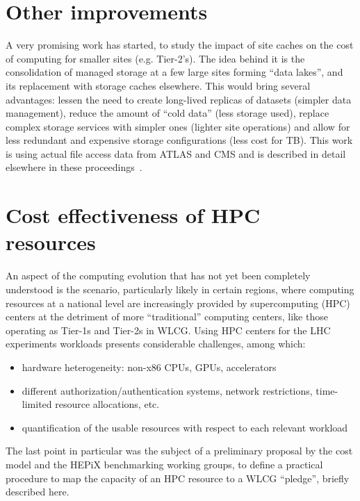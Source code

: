 \section{Other improvements}
A very promising work has started, to study the impact of site caches
on the cost of computing for smaller sites (e.g. Tier-2's). The idea
behind it is the consolidation of managed storage at a few large sites
forming ``data lakes'', and its replacement with storage caches
elsewhere. This would bring several advantages: lessen the need to
create long-lived replicas of datasets (simpler data management),
reduce the amount of ``cold data'' (less storage used), replace
complex storage services with simpler ones (lighter site operations)
and allow for less redundant and expensive storage configurations
(less cost for TB). This work is using actual file access data from
ATLAS and CMS and is described in detail elsewhere in these
proceedings~\cite{cache}.

\section{Cost effectiveness of HPC resources}
An aspect of the computing evolution that has not yet been completely
understood is the scenario, particularly likely in certain regions,
where computing resources at a national level are increasingly
provided by supercomputing (HPC) centers at the detriment of more
``traditional'' computing centers, like those operating as Tier-1s and
Tier-2s in WLCG. Using HPC centers for the LHC experiments workloads
presents considerable challenges, among which:
\begin{itemize}
\item hardware heterogeneity: non-x86 CPUs, GPUs, accelerators
\item different authorization/authentication systems, network
  restrictions, time-limited resource allocations, etc.
\item quantification of the usable resources with respect to each
  relevant workload
\end{itemize}

The last point in particular was the subject of a preliminary proposal
by the cost model and the HEPiX benchmarking working groups, to define
a practical procedure to map the capacity of an HPC resource to a WLCG
``pledge'', briefly described here.

